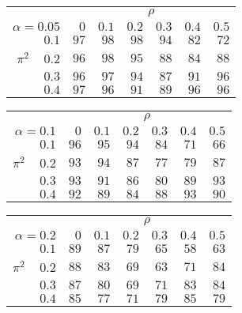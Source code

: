 \begin{tabular}{r|rrrrrr}
\hline\hline
 &\multicolumn{6}{c}{$\rho$} \\ 
 $\alpha = 0.05$ & $0$ & $0.1$ & $0.2$ & $0.3$ & $0.4$ & $0.5$ \\ 
 \hline$0.1$ & $97$ & $98$ & $98$ & $94$ & $82$ & $72$\\ 
$\pi^2\;\;\;$ $0.2$ & $96$ & $98$ & $95$ & $88$ & $84$ & $88$\\ 
$0.3$ & $96$ & $97$ & $94$ & $87$ & $91$ & $96$\\ 
$0.4$ & $97$ & $96$ & $91$ & $89$ & $96$ & $96$\\ 
 \hline 
 \end{tabular}
 
 \vspace{2em} 
 
\begin{tabular}{r|rrrrrr}
\hline\hline
 &\multicolumn{6}{c}{$\rho$} \\ 
 $\alpha = 0.1$ & $0$ & $0.1$ & $0.2$ & $0.3$ & $0.4$ & $0.5$ \\ 
 \hline$0.1$ & $96$ & $95$ & $94$ & $84$ & $71$ & $66$\\ 
$\pi^2\;\;\;$ $0.2$ & $93$ & $94$ & $87$ & $77$ & $79$ & $87$\\ 
$0.3$ & $93$ & $91$ & $86$ & $80$ & $89$ & $93$\\ 
$0.4$ & $92$ & $89$ & $84$ & $88$ & $93$ & $90$\\ 
 \hline 
 \end{tabular}
 
 \vspace{2em} 
 
\begin{tabular}{r|rrrrrr}
\hline\hline
 &\multicolumn{6}{c}{$\rho$} \\ 
 $\alpha = 0.2$ & $0$ & $0.1$ & $0.2$ & $0.3$ & $0.4$ & $0.5$ \\ 
 \hline$0.1$ & $89$ & $87$ & $79$ & $65$ & $58$ & $63$\\ 
$\pi^2\;\;\;$ $0.2$ & $88$ & $83$ & $69$ & $63$ & $71$ & $84$\\ 
$0.3$ & $87$ & $80$ & $69$ & $71$ & $83$ & $84$\\ 
$0.4$ & $85$ & $77$ & $71$ & $79$ & $85$ & $79$\\ 
 \hline 
 \end{tabular}